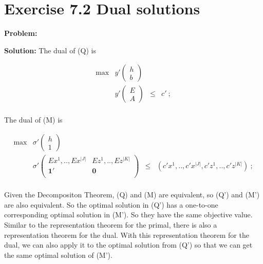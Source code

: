 \section{Exercise 7.2 Dual solutions}
\textbf{Problem:} 

\textbf{Solution:} The dual of (Q) is

\[
\tag{$Q'$}
\begin{array}{ccrrcl}
 \max & y'\left(
  \begin{array}{c}
   h\\
   b
  \end{array}
\right)  &      &   \\
      &  y'\left(
  \begin{array}{c}
   E\\
   A
  \end{array}
\right)  &   \leq  & c'~; \\
\end{array}
\]

The dual of (M) is

\[
\tag{$M'$}
\begin{array}{ccrrcl}
 \max & \sigma'\left(
  \begin{array}{c}
   h\\
   1
  \end{array}
\right)  &      &   \\
      &  \sigma'\left(
  \begin{array}{cc}
   Ex^1,..,Ex^{|J|} & Ez^1,..,Ez^{|K|}\\
   \mathbf{1}' & \mathbf{0}\\
  \end{array}
\right)  &   \leq  & (c'x^1,..,c'x^{|J|},c'z^1,..,c'z^{|K|})~; \\
\end{array}
\]

Given the Decompositon Theorem, (Q) and (M) are equivalent, so (Q') and (M') are also equivalent. So the optimal solution in (Q') has a one-to-one corresponding optimal solution in (M'). So they have the same objective value. Similar to the representation theorem for the primal, there is also a representation theorem for the dual. With this representation theorem for the dual, we can also apply it to the optimal solution from (Q') so that we can get the same optimal solution of (M').